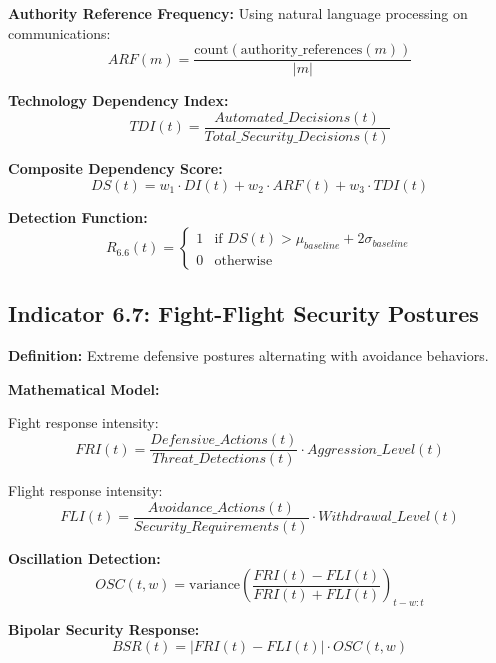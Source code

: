 \documentclass[11pt,a4paper]{article}
\begin{document}
\textbf{Authority Reference Frequency:}
Using natural language processing on communications:
\begin{equation}
ARF(m) = \frac{\text{count}(\text{authority\_references}(m))}{|m|}
\end{equation}

\textbf{Technology Dependency Index:}
\begin{equation}
TDI(t) = \frac{Automated\_Decisions(t)}{Total\_Security\_Decisions(t)}
\end{equation}

\textbf{Composite Dependency Score:}
\begin{equation}
DS(t) = w_1 \cdot DI(t) + w_2 \cdot ARF(t) + w_3 \cdot TDI(t)
\end{equation}

\textbf{Detection Function:}
\begin{equation}
R_{6.6}(t) = \begin{cases}
1 & \text{if } DS(t) > \mu_{baseline} + 2\sigma_{baseline} \\
0 & \text{otherwise}
\end{cases}
\end{equation}

\subsection{Indicator 6.7: Fight-Flight Security Postures}

\textbf{Definition:} Extreme defensive postures alternating with avoidance behaviors.

\textbf{Mathematical Model:}

Fight response intensity:
\begin{equation}
FRI(t) = \frac{Defensive\_Actions(t)}{Threat\_Detections(t)} \cdot Aggression\_Level(t)
\end{equation}

Flight response intensity:
\begin{equation}
FLI(t) = \frac{Avoidance\_Actions(t)}{Security\_Requirements(t)} \cdot Withdrawal\_Level(t)
\end{equation}

\textbf{Oscillation Detection:}
\begin{equation}
OSC(t,w) = \text{variance}\left(\frac{FRI(t) - FLI(t)}{FRI(t) + FLI(t)}\right)_{t-w:t}
\end{equation}

\textbf{Bipolar Security Response:}
\begin{equation}
BSR(t) = |FRI(t) - FLI(t)| \cdot OSC(t,w)
\end{equation}
\end{document}
